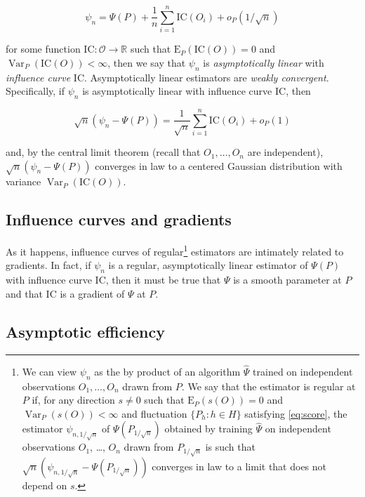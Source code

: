 \documentclass[
  11pt,
  openright,twoside]{book}
\DeclareMathOperator{\Var}{Var}
\newcommand{\bbR}{\mathbb{R}}
\newcommand{\calO}{\mathcal{O}}
\newcommand{\Exp}{\textrm{E}}
\newcommand{\IC}{\textrm{IC}}
\newcommand{\Psihat}{\widehat{\Psi}}
\theoremstyle{definition}
\theoremstyle{definition}
\theoremstyle{definition}
\theoremstyle{definition}
\theoremstyle{remark}
\begin{document}
\begin{equation} 
\psi_n  =  \Psi(P) +  \frac{1}{n}\sum_{i=1}^n  \IC(O_i)  +
o_{P}(1/\sqrt{n}) \label{eq:asymptotic-lin}
\end{equation}

for some function \(\IC : \calO \to \bbR\) such that \(\Exp_P(\IC(O)) = 0\) and
\(\Var_{P}(\IC(O)) < \infty\), then we say that \(\psi_n\) is \emph{asymptotically
linear} with \emph{influence curve} \(\IC\). Asymptotically linear estimators are
\emph{weakly convergent}. Specifically, if \(\psi_n\) is asymptotically linear with
influence curve \(\IC\), then

\begin{equation}
\sqrt{n}  (\psi_n  - \Psi(P))  =  \frac{1}{\sqrt{n}}  \sum_{i=1}^n \IC(O_i)  +
o_P(1) \label{eq:asymp-lin}
\end{equation}

and, by the central limit theorem (recall that \(O_{1}, \ldots, O_{n}\) are
independent), \(\sqrt{n} (\psi_n - \Psi(P))\) converges in law to a centered
Gaussian distribution with variance \(\Var_P(\IC(O))\).

\hypertarget{influence-curves-and-gradients}{%
\subsection{Influence curves and gradients}\label{influence-curves-and-gradients}}

As it happens, influence curves of regular\footnote{We can view \(\psi_{n}\) as the by
  product of an algorithm \(\Psihat\) trained on independent
  observations \(O_{1}, \ldots, O_{n}\) drawn from \(P\). We say that the estimator
  is regular at \(P\) if, for any direction \(s\neq 0\) such that \(\Exp_{P} (s(O)) = 0\) and \(\Var_{P} (s(O)) < \infty\) and fluctuation \(\{P_{h} : h \in H\}\)
  satisfying \eqref{eq:score}, the estimator \(\psi_{n,1/\sqrt{n}}\) of
  \(\Psi(P_{1/\sqrt{n}})\) obtained by training \(\Psihat\) on independent
  observations \(O_{1}\), \ldots, \(O_{n}\) drawn from \(P_{1/\sqrt{n}}\) is such that
  \(\sqrt{n} (\psi_{n,1/\sqrt{n}} - \Psi(P_{1/\sqrt{n}}))\) converges in law to a
  limit that does not depend on \(s\).} estimators are intimately related to
gradients. In fact, if \(\psi_n\) is a regular, asymptotically linear estimator
of \(\Psi(P)\) with influence curve \(\IC\), then it must be true that \(\Psi\) is a
smooth parameter at \(P\) and that \(\IC\) is a gradient of \(\Psi\) at \(P\).

\hypertarget{asymptotic-efficiency}{%
\subsection{Asymptotic efficiency}\label{asymptotic-efficiency}}
\end{document}
